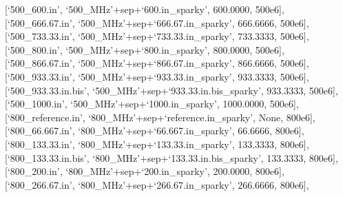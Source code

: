 \begin{exampleenv}
\hspace*{4ex} [`500\_600.in',          `500\_MHz'+sep+`600.in\_sparky',             600.0000,  500e6], \\
\hspace*{4ex} [`500\_666.67.in',       `500\_MHz'+sep+`666.67.in\_sparky',          666.6666,  500e6], \\
\hspace*{4ex} [`500\_733.33.in',       `500\_MHz'+sep+`733.33.in\_sparky',          733.3333,  500e6], \\
\hspace*{4ex} [`500\_800.in',          `500\_MHz'+sep+`800.in\_sparky',             800.0000,  500e6], \\
\hspace*{4ex} [`500\_866.67.in',       `500\_MHz'+sep+`866.67.in\_sparky',          866.6666,  500e6], \\
\hspace*{4ex} [`500\_933.33.in',       `500\_MHz'+sep+`933.33.in\_sparky',          933.3333,  500e6], \\
\hspace*{4ex} [`500\_933.33.in.bis',   `500\_MHz'+sep+`933.33.in.bis\_sparky',      933.3333,  500e6], \\
\hspace*{4ex} [`500\_1000.in',         `500\_MHz'+sep+`1000.in\_sparky',           1000.0000,  500e6], \\
\hspace*{4ex} [`800\_reference.in',    `800\_MHz'+sep+`reference.in\_sparky',           None,  800e6], \\
\hspace*{4ex} [`800\_66.667.in',       `800\_MHz'+sep+`66.667.in\_sparky',           66.6666,  800e6], \\
\hspace*{4ex} [`800\_133.33.in',       `800\_MHz'+sep+`133.33.in\_sparky',          133.3333,  800e6], \\
\hspace*{4ex} [`800\_133.33.in.bis',   `800\_MHz'+sep+`133.33.in.bis\_sparky',      133.3333,  800e6], \\
\hspace*{4ex} [`800\_200.in',          `800\_MHz'+sep+`200.in\_sparky',             200.0000,  800e6], \\
\hspace*{4ex} [`800\_266.67.in',       `800\_MHz'+sep+`266.67.in\_sparky',          266.6666,  800e6], \\

\end{exampleenv}
